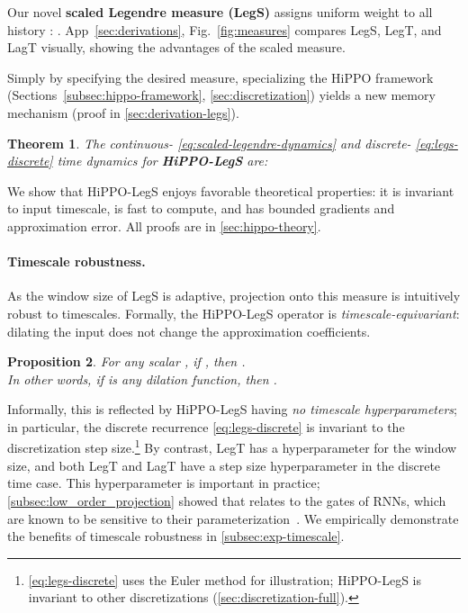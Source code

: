 \documentclass{article}
\newtheorem{theorem}{Theorem}
\newtheorem{proposition}[theorem]{Proposition}
\begin{document}
Our novel \textbf{scaled Legendre measure (LegS)} assigns uniform weight to all history :
. App~\ref{sec:derivations}, Fig.~\ref{fig:measures} compares LegS, LegT, and LagT visually, showing the advantages of the scaled measure.


Simply by specifying the desired measure, specializing the HiPPO framework (Sections~\ref{subsec:hippo-framework}, \ref{sec:discretization})
yields a new memory mechanism (proof in \cref{sec:derivation-legs}).
\begin{theorem}
  \label{thm:legs}
  The continuous- \eqref{eq:scaled-legendre-dynamics}
  and discrete- \eqref{eq:legs-discrete} time dynamics for \textbf{HiPPO-LegS} are:
  \small

  \begin{minipage}{.35\linewidth}
    
  \end{minipage}\hfill
  \begin{minipage}{.52\linewidth}
    
  \end{minipage}
\end{theorem}

We show that HiPPO-LegS enjoys favorable
theoretical properties: it is invariant to input timescale, is fast to compute,
and has bounded gradients and approximation error.
All proofs are in \cref{sec:hippo-theory}.

\paragraph{Timescale robustness.}
As the window size of LegS is adaptive, projection onto this measure is intuitively robust to timescales.
Formally, the HiPPO-LegS operator is \emph{timescale-equivariant}:
dilating the input  does not change the approximation coefficients.
\begin{proposition}
    \label{prop:timescale}
    For any scalar , if , then
    .
    \\ In other words, if  is any dilation function, then
    .
\end{proposition}

Informally, this is reflected by HiPPO-LegS having \emph{no timescale hyperparameters};
in particular, the discrete recurrence \eqref{eq:legs-discrete} is invariant to the discretization step size.\footnote{\eqref{eq:legs-discrete} uses the Euler method for illustration; HiPPO-LegS is invariant to other discretizations (\cref{sec:discretization-full}).}
By contrast, LegT has a hyperparameter  for the window size, and both LegT and LagT have a step size hyperparameter  in the discrete time case.
This hyperparameter is important in practice; \cref{subsec:low_order_projection} showed that  relates to the gates of RNNs, which are known to be sensitive to their parameterization~\cite{jozefowicz2015empirical,tallec2018can,gu2020improving}.
We empirically demonstrate the benefits of timescale robustness in \cref{subsec:exp-timescale}.
\end{document}
